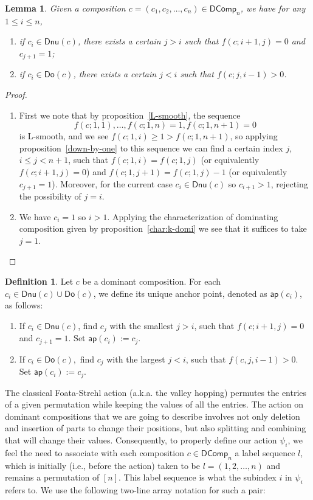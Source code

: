 \documentclass[reqno]{amsart}
\numberwithin{equation}{section}
\newtheorem{lemma}[theorem]{Lemma}
\theoremstyle{definition}
\newtheorem{definition}{Definition}[section]
\theoremstyle{named}
\def\DComp{\mathsf{DComp}}
\def\Dnu{\mathsf{Dnu}}
\def\Do{\mathsf{Do}}
\def\ap{\mathsf{ap}}
\begin{document}
\renewcommand\theenumi{\roman{enumi}}
\renewcommand\labelenumi{(\theenumi)}
\begin{lemma}\label{lemma-ap}
Given a composition $c=\left(c_1, c_2, \ldots, c_n\right) \in \DComp_n$, we have for any $1\le i\le n$,
\begin{enumerate}
	\item if $c_i\in \Dnu(c)$, there exists a certain $j>i$ such that $f(c;i+1,j)=0$ and $c_{j+1}=1$;
	\item if $c_i\in \Do(c)$, there exists a certain $j<i$ such that  $f(c;j,i-1)>0$. 
\end{enumerate}
\end{lemma}
\begin{proof}
\begin{enumerate}
	\item First we note that by proposition~\ref{L-smooth}, the sequence $$f(c;1,1),\ldots,f(c;1,n)=1,f(c;1,n+1)=0$$ is L-smooth, and we see $f(c;1,i)\ge 1>f(c;1,n+1)$, so applying proposition~\ref{down-by-one} to this sequence we can find a certain index $j$, $i\le j<n+1$, such that $f(c;1,i)=f(c;1,j)$ (or equivalently $f(c;i+1,j)=0$) and $f(c;1,j+1)=f(c;1,j)-1$ (or equivalently $c_{j+1}=1$). Moreover, for the current case $c_i\in\Dnu(c)$ so $c_{i+1}>1$, rejecting the possibility of $j=i$.\\
  \item We have $c_i=1$ so $i>1$. Applying the characterization of dominating composition given by proposition~\ref{char:k-domi} we see that it suffices to take $j=1$.
\end{enumerate}
\end{proof}
\begin{definition}\label{def:anchor}
Let $c$ be a dominant composition. For each $c_i\in \Dnu(c)\cup \Do(c)$, we define its unique anchor point, denoted as $\ap(c_i)$, as follows:
\begin{enumerate}
	\item If $c_i\in \Dnu(c)$, find $c_j$ with the smallest $j > i$, such that $f(c;i + 1,j) = 0$ and $c_{j+1 } = 1$. Set $\ap(c_i):= c_j$. 
	\item If $c_i\in \Do(c),$ find $c_j$ with the largest $j < i$, such that $f (c,j,i-1) > 0$. Set $\ap(c_i):= c_j$. 
\end{enumerate}
\end{definition}
The classical Foata-Strehl action \cite[Chap.~4.1]{Ath2018} (a.k.a. the valley hopping) permutes the entries of a given permutation while keeping the values of all the entries. The action on dominant compositions that we are going to describe involves not only deletion and insertion of parts to change their positions, but also splitting and combining that will change their values. Consequently, to properly define our action $\psi_i$, we feel the need to associate with each composition $c\in\DComp_n$ a label sequence $l$, which is initially (i.e., before the action) taken to be $l=(1,2,\ldots,n)$ and remains a permutation of $[n]$. This label sequence is what the subindex $i$ in $\psi_i$ refers to. We use the following two-line array notation for such a pair:
\end{document}
